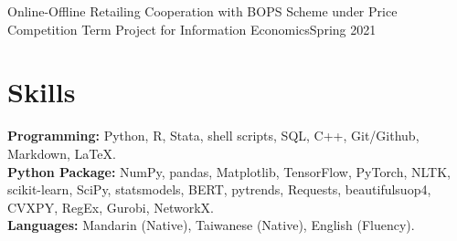 \documentclass{academicThemeCV}
\begin{document}
    \resumeSubheading
    {Online-Offline Retailing Cooperation with BOPS Scheme under Price Competition}{}
    {Term Project for Information Economics}{Spring 2021}
    \resumeItemListStart

    \resumeItemListEnd

  \resumeSubHeadingListEnd

\section{Skills}
  \vspace{1pt}
  \resumeSubHeadingListStart
    \vspace{-5pt}
    \small{\item{
        \textbf{Programming: }{Python, R, Stata, shell scripts,
        SQL, C++, Git/Github, Markdown, \LaTeX.} \\ 
        \textbf{Python Package: }{
          NumPy, pandas, Matplotlib, TensorFlow, PyTorch, NLTK, scikit-learn, SciPy, statsmodels,
        BERT, pytrends, Requests, beautifulsuop4, CVXPY, RegEx, 
        Gurobi, NetworkX.} \\
      \textbf{Languages: }{Mandarin (Native), Taiwanese (Native), English (Fluency).}
        
    }}
  \resumeSubHeadingListEnd



\end{document}
